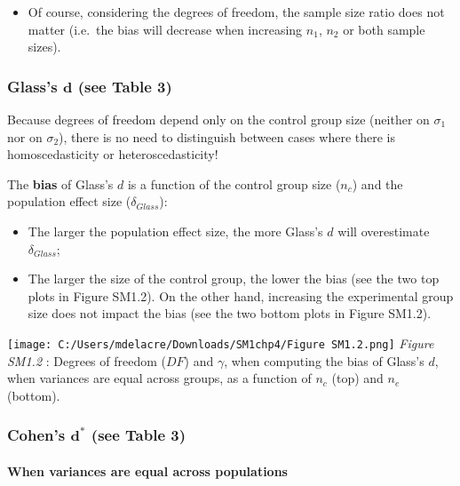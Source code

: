 \documentclass[
  english,
  man,mask,floatsintext]{apa6}
\providecommand{\tightlist}{%
  \setlength{\itemsep}{0pt}\setlength{\parskip}{0pt}}
\let\oldparagraph\paragraph
\renewcommand{\paragraph}[1]{\oldparagraph{#1}\mbox{}}
\begin{document}
\begin{itemize}
\tightlist
\item
  Of course, considering the degrees of freedom, the sample size ratio does not matter (i.e.~the bias will decrease when increasing \(n_1\), \(n_2\) or both sample sizes).
\end{itemize}

\hypertarget{glasss-bmd-see-table-3}{%
\subsubsection{\texorpdfstring{Glass's \(\bm{d}\) (see Table 3)}{Glass's \textbackslash bm\{d\} (see Table 3)}}\label{glasss-bmd-see-table-3}}

Because degrees of freedom depend only on the control group size (neither on \(\sigma_1\) nor on \(\sigma_2\)), there is no need to distinguish between cases where there is homoscedasticity or heteroscedasticity!

The \textbf{bias} of Glass's \(d\) is a function of the control group size (\(n_c\)) and the population effect size (\(\delta_{Glass}\)):

\begin{itemize}
\item
  The larger the population effect size, the more Glass's \(d\) will overestimate \(\delta_{Glass}\);
\item
  The larger the size of the control group, the lower the bias (see the two top plots in Figure SM1.2). On the other hand, increasing the experimental group size does not impact the bias (see the two bottom plots in Figure SM1.2).
\end{itemize}

\texttt{[image: C:/Users/mdelacre/Downloads/SM1chp4/Figure SM1.2.png]}
\emph{Figure SM1.2} : Degrees of freedom (\(DF\)) and \(\gamma\), when computing the bias of Glass's \(d\), when variances are equal across groups, as a function of \(n_c\) (top) and \(n_e\) (bottom).

\hypertarget{cohens-bmd-see-table-3}{%
\subsubsection{\texorpdfstring{Cohen's \(\bm{d^*}\) (see Table 3)}{Cohen's \textbackslash bm\{d\^{}*\} (see Table 3)}}\label{cohens-bmd-see-table-3}}

\hypertarget{when-variances-are-equal-across-populations}{%
\paragraph{When variances are equal across populations}\label{when-variances-are-equal-across-populations}}
\end{document}
